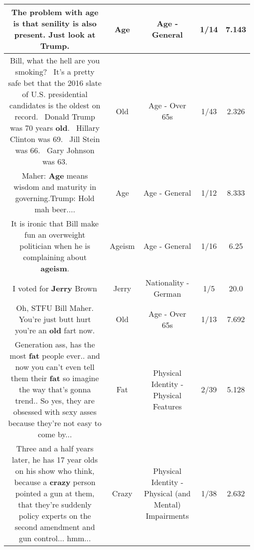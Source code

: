 \documentclass[11pt]{article}
\newlength\mylength
\begin{document}
\begin{center}
\begin{longtable}{|C{.65\mylength}|C{.30\mylength}|C{.12\mylength}|C{.12\mylength}|C{.12\mylength}|}
  \small The problem with \textbf{age} is that senility is also present. Just look at Trump.\normalsize   & Age & Age - General & 1/14 & 7.143 \\  \hline
  \small Bill, what the hell are you smoking?  It's a pretty safe bet that the 2016 slate of U.S. presidential candidates is the oldest on record.  Donald Trump was 70 years \textbf{old}.  Hillary Clinton was 69.  Jill Stein was 66.  Gary Johnson was 63.\normalsize   & Old & Age - Over 65s & 1/43 & 2.326 \\  \hline
  \small Maher: \textbf{Age} means wisdom and maturity in governing.Trump: Hold mah beer....\normalsize   & Age & Age - General & 1/12 & 8.333 \\  \hline
  \small It is ironic that Bill make fun an overweight politician when he is complaining about \textbf{ageism}.\normalsize   & Ageism & Age - General & 1/16 & 6.25 \\  \hline
  \small I voted for \textbf{Jerry} Brown\normalsize   & Jerry & Nationality - German & 1/5 & 20.0 \\  \hline
  \small Oh, STFU Bill Maher. You're just butt hurt you're an \textbf{old} fart now.\normalsize   & Old & Age - Over 65s & 1/13 & 7.692 \\  \hline
  \small Generation ass,  has the most \textbf{fat} people ever.. and now you can't even tell them their \textbf{fat} so imagine the way that's gonna trend.. So yes, they are obsessed with sexy asses because they're not easy to come by...\normalsize   & Fat & Physical Identity - Physical Features & 2/39 & 5.128 \\  \hline
  \small Three and a half years later, he has 17 year olds on his show who think, because a \textbf{crazy} person pointed a gun at them, that they're suddenly policy experts on the second amendment and gun control... hmm...\normalsize   & Crazy & Physical Identity - Physical (and Mental) Impairments & 1/38 & 2.632 \\  \hline

\end{longtable}
\end{center}
\end{document}
